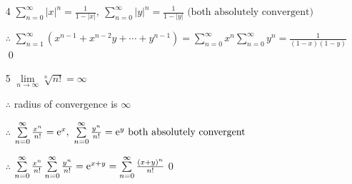 \begin{enumerate}[1]
        \item[4]
        $\sum\limits_{n=0}^\infty |x|^n =\frac{1}{1-|x|},\ \sum\limits_{n=0}^\infty |y|^n =\frac{1}{1-|y|}\text{ (both absolutely convergent)}$
        \par $\therefore$ $\sum\limits_{n=1}^\infty (x^{n-1}+x^{n-2}y+ \cdots +y^{n-1})=\sum\limits_{n=0}^\infty x^n\sum\limits_{n=0}^\infty y^n=\frac{1}{(1-x)(1-y)}$\qed

        \item[5]
        $\lim\limits_{n\rightarrow{\infty}}\sqrt[n]{n!}=\infty$
        \par $\therefore$ radius of convergence is $\infty$
        \par $\therefore$ $\sum\limits_{n=0}^\infty \frac{x^n}{n!}=\mathrm{e}^x,\ \sum\limits_{n=0}^\infty \frac{y^n}{n!}=\mathrm{e}^y \text{ both absolutely convergent}$
        \par $\therefore$ $\sum\limits_{n=0}^\infty \frac{x^n}{n!}\sum\limits_{n=0}^\infty \frac{y^n}{n!}=\mathrm{e} ^{x+y}=\sum\limits_{n=0}^\infty \frac{(x+y)^n}{n!}$\qed
    \end{enumerate}

